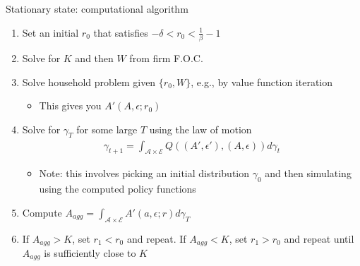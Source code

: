 \documentclass[9pt]{beamer}
\newcommand{\bit}{\begin{itemize}}
\newcommand{\eit}{\end{itemize}}
\newcommand{\ben}{\begin{enumerate}}
\newcommand{\een}{\end{enumerate}}
\begin{document}
%
%
%
%
%
%


\begin{frame}{Stationary state: computational algorithm}

\ben
\setlength\itemsep{1.5em}

\item Set an initial $r_0$ that satisfies $-\delta<r_0<\frac{1}{\beta}-1$

\item Solve for $K$ and then $W$ from firm F.O.C.

\item Solve household problem given $\{r_0,W\}$, e.g., by value function iteration
\bit
	\item This gives you $A'(A, \epsilon; r_0)$
\eit

\item Solve for $\gamma_{T}$ for some large $T$ using the law of motion
\begin{eqnarray}
\gamma_{t+1} = \int_{\bm{\mathcal A} \times \bm{\mathcal E}} Q((A',\epsilon'), (A, \epsilon)) d\gamma_t \nonumber
\end{eqnarray}
\bit
	\item Note: this involves picking an initial distribution $\gamma_0$ and then simulating using the computed policy functions
\eit

\item Compute $A_{agg}=\int_{\bm{\mathcal A} \times \bm{\mathcal E}} A'(a,\epsilon; r) d\gamma_T$

\item If $A_{agg}>K$, set $r_1<r_0$ and repeat. If $A_{agg}<K$, set $r_1>r_0$ and repeat until $A_{agg}$ is sufficiently close to $K$

\een

\end{frame}
\end{document}
